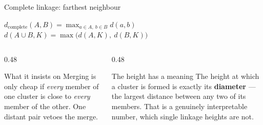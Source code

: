 \documentclass[aspectratio=169]{beamer}
\begin{document}
\begin{frame}[shrink=4]{Complete linkage: farthest neighbour}
  \begin{exampleblock}{}
    \centering\large
    $d_{\text{complete}}(A,B) = \displaystyle\max_{a \in A,\ b \in B} d(a,b)$
    \qquad
    $d(A \cup B, K) = \max\bigl(d(A,K),\ d(B,K)\bigr)$
  \end{exampleblock}
  \begin{columns}[T]
    \begin{column}{0.48\textwidth}
      \begin{block}{What it insists on}
        Merging is only cheap if \emph{every} member of one cluster is close
        to \emph{every} member of the other. One distant pair vetoes the
        merge.
      \end{block}
    \end{column}
    \begin{column}{0.48\textwidth}
      \begin{alertblock}{The height has a meaning}
        The height at which a cluster is formed is exactly its
        \textbf{diameter} --- the largest distance between any two of its
        members. That is a genuinely interpretable number, which single
        linkage heights are not.
      \end{alertblock}
    \end{column}
  \end{columns}
\end{frame}
\end{document}
